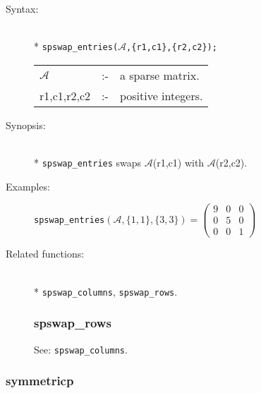 \begin{description}
\item[Syntax:]\mbox{}\\*
\texttt{spswap\_entries($\mathcal{A}$,\{r1,c1\},\{r2,c2\});}\\[2mm]
\begin{tabular}{l l l}
$\mathcal{A}$  &:-& a sparse matrix. \\
r1,c1,r2,c2 &:-& positive integers.
\end{tabular}

\item[Synopsis:]\mbox{}\\*
\texttt{spswap\_entries} swaps $\mathcal{A}$(r1,c1) with
                $\mathcal{A}$(r2,c2).

\item[Examples:]
\begin{flushleft}
\texttt{spswap\_entries}\((\mathcal{A},\{1,1\},\{3,3\}) =
        \begin{pmatrix} 9 & 0 & 0 \\ 0 & 5 & 0 \\ 0 & 0 & 1 \end{pmatrix}
\)
\end{flushleft}

\item[Related functions:]\mbox{}\\*
\texttt{spswap\_columns}, \texttt{spswap\_rows}.


\subsubsection{spswap\_rows}
\label{sparse:spswap_rows}
See: \texttt{spswap\_columns}.
\end{description}

\subsubsection{symmetricp}
\label{sparse:symmetricp}

